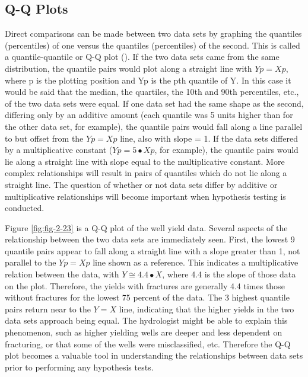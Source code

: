 \documentclass[]{book}
\begin{document}
\hypertarget{q-q-plots}{%
\subsection{Q-Q Plots}\label{q-q-plots}}

Direct comparisons can be made between two data sets by graphing the quantiles (percentiles) of one versus the quantiles (percentiles) of the second. This is called a quantile-quantile or Q-Q plot (\citet{chambers_graphical_1983}). If the two data sets came from the same distribution, the quantile pairs would plot along a straight line with \(Yp = Xp\), where p is the plotting position and Yp is the pth quantile of Y. In this case it would be said that the median, the quartiles, the 10th and 90th percentiles, etc., of the two data sets were equal. If one data set had the same shape as the second, differing only by an additive amount (each quantile was 5 units higher than for the other data set, for example), the quantile pairs would fall along a line parallel to but offset from the \(Yp = Xp\) line, also with slope = 1. If the data sets differed by a multiplicative constant (\(Yp = 5 \bullet Xp\), for example), the quantile pairs would lie along a straight line with slope equal to the multiplicative constant. More complex relationships will result in pairs of quantiles which do not lie along a straight line. The question of whether or not data sets differ by additive or multiplicative relationships will become important when hypothesis testing is conducted.

Figure \ref{fig:fig-2-23} is a Q-Q plot of the well yield data. Several aspects of the relationship between the two data sets are immediately seen. First, the lowest 9 quantile pairs appear to fall along a straight line with a slope greater than 1, not parallel to the \(Yp = Xp\) line shown as a reference. This indicates a multiplicative relation between the data, with \(Y \cong 4.4 \bullet X\), where 4.4 is the slope of those data on the plot. Therefore, the yields with fractures are generally 4.4 times those without fractures for the lowest 75 percent of the data. The 3 highest quantile pairs return near to the \(Y = X\) line, indicating that the higher yields in the two data sets approach being equal. The hydrologist might be able to explain this phenomenon, such as higher yielding wells are deeper and less dependent on fracturing, or that some of the wells were misclassified, etc. Therefore the Q-Q plot becomes a valuable tool in understanding the relationships between data sets prior to performing any hypothesis tests.
\end{document}
